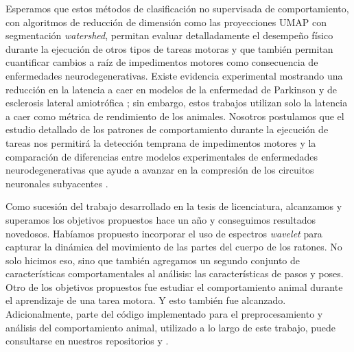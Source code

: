 Esperamos que estos métodos de clasificación no supervisada de comportamiento, con algoritmos de reducción de dimensión como las proyecciones UMAP con segmentación \textit{watershed}, permitan evaluar detalladamente el desempeño físico durante la ejecución de otros tipos de tareas motoras y que también permitan cuantificar cambios a raíz de impedimentos motores como consecuencia de enfermedades neurodegenerativas. Existe evidencia experimental mostrando una reducción en la latencia a caer en modelos de la enfermedad de Parkinson y de esclerosis lateral amiotrófica \cite{costa_motor_learning, campos_parkinson}; sin embargo, estos trabajos utilizan solo la latencia a caer como métrica de rendimiento de los animales. Nosotros postulamos que el estudio detallado de los patrones de comportamiento durante la ejecución de tareas nos permitirá la detección temprana de impedimentos motores y la comparación de diferencias entre modelos experimentales de enfermedades neurodegenerativas que ayude a avanzar en la compresión de los circuitos neuronales subyacentes \cite{alfieri_motor_deficit}.

Como sucesión del trabajo desarrollado en la tesis de licenciatura, alcanzamos y superamos los objetivos propuestos hace un año y conseguimos resultados novedosos. Habíamos propuesto incorporar el uso de espectros \textit{wavelet} para capturar la dinámica del movimiento de las partes del cuerpo de los ratones. No solo hicimos eso, sino que también agregamos un segundo conjunto de características comportamentales al análisis: las características de pasos y poses. Otro de los objetivos propuestos fue estudiar el comportamiento animal durante el aprendizaje de una tarea motora. Y esto también fue alcanzado. Adicionalmente, parte del código implementado para el preprocesamiento y análisis del comportamiento animal, utilizado a lo largo de este trabajo, puede consultarse en nuestros repositorios \href{https://github.com/alvaro-concha/animal-behavior-preprocessing}{\color{blue}{animal-behavior-preprocessing}} y \href{https://github.com/alvaro-concha/animal-behavior-analysis}{\color{blue}{animal-behavior-analysis}}.